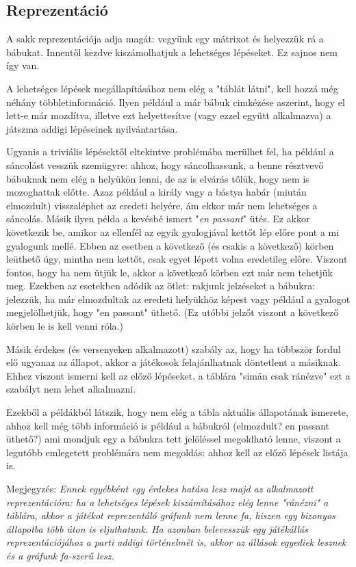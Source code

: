 \documentclass[twoside, a4paper, 12pt]{article}
\begin{document}
\newpage
\subsection{Reprezentáció}
A sakk reprezentációja adja magát: vegyünk egy mátrixot és helyezzük rá a bábukat. Innentől kezdve kiszámolhatjuk a lehetséges lépéseket. Ez sajnos nem így van.

A lehetséges lépések megállapításához nem elég a "táblát látni", kell hozzá még néhány többletinformáció. Ilyen például a már bábuk cimkézése aszerint, hogy el lett-e már mozdítva, illetve ezt helyettesítve (vagy ezzel együtt alkalmazva) a játszma addigi lépéseinek nyilvántartása.

Ugyanis a triviális lépésektől eltekintve problémába merülhet fel, ha például a sáncolást vesszük szemügyre: ahhoz, hogy sáncolhassunk, a benne résztvevő bábuknak nem elég a helyükön lenni, de az is elvárás tőlük, hogy nem is mozoghattak előtte. Azaz például a király vagy a bástya habár (miután elmozdult) visszaléphet az eredeti helyére, ám ekkor már nem lehetséges a sáncolás. Másik ilyen példa a kevésbé ismert "\textit{en passant}" ütés. Ez akkor következik be, amikor az ellenfél az egyik gyalogjával kettőt lép előre pont a mi gyalogunk mellé. Ebben az esetben a következő (és csakis a következő) körben leüthető úgy, mintha nem kettőt, csak egyet lépett volna eredetileg előre. Viszont fontos, hogy ha nem ütjük le, akkor a következő körben ezt már nem tehetjük meg. Ezekben az esetekben adódik az ötlet: rakjunk jelzéseket a bábukra: jelezzük, ha már elmozdultak az eredeti helyükhöz képest vagy például a gyalogot megjelölhetjük, hogy "en passant" üthető. (Ez utóbbi jelzőt viszont a következő körben le is kell venni róla.)

Másik érdekes (és versenyeken alkalmazott) szabály az, hogy ha többször fordul elő ugyanaz az állapot, akkor a játékosok felajánlhatnak döntetlent a másiknak. Ehhez viszont ismerni kell az előző lépéseket, a táblára "simán csak ránézve" ezt a szabályt nem lehet alkalmazni.

Ezekből a példákból látszik, hogy nem elég a tábla aktuális állapotának ismerete, ahhoz kell még több információ is például a bábukról (elmozdult? en passant üthető?) ami mondjuk egy a bábukra tett jelöléssel megoldható lenne, viszont a legutóbb emlegetett problémára nem megoldás: ahhoz kell az előző lépések listája is.

Megjegyzés: \textit{Ennek egyébként egy érdekes hatása lesz majd az alkalmazott reprezentációra: ha a lehetséges lépések kiszámításához elég lenne "ránézni" a táblára, akkor a játékot reprezentáló gráfunk nem lenne fa, hiszen egy bizonyos állapotba több úton is eljuthatunk. Ha azonban belevesszük egy játékállás reprezentációjához a parti addigi történelmét is, akkor az állások egyediek lesznek és a gráfunk fa-szerű lesz.}
\end{document}
